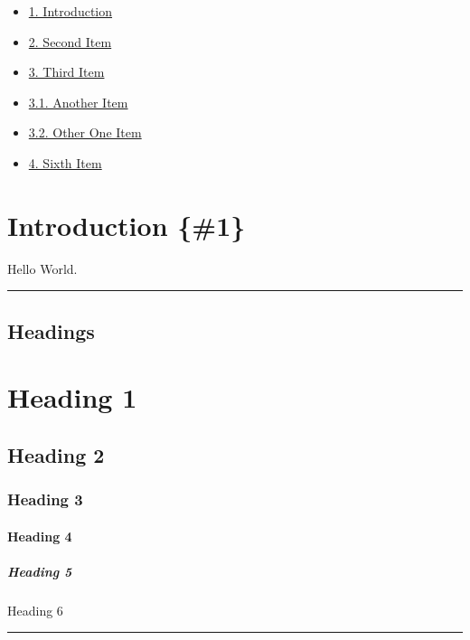 \documentclass[]{article}
\providecommand{\tightlist}{%
  \setlength{\itemsep}{0pt}\setlength{\parskip}{0pt}}
\let\oldparagraph\paragraph
\renewcommand{\paragraph}[1]{\oldparagraph{#1}\mbox{}}
\let\oldsubparagraph\subparagraph
\renewcommand{\subparagraph}[1]{\oldsubparagraph{#1}\mbox{}}
\begin{document}
\begin{itemize}
\tightlist
\item
  \protect\hyperlink{1}{1. Introduction}
\item
  \protect\hyperlink{2}{2. Second Item}
\item
  \protect\hyperlink{3}{3. Third Item}
\item
  \protect\hyperlink{4}{3.1. Another Item}
\item
  \protect\hyperlink{5}{3.2. Other One Item}
\item
  \protect\hyperlink{6}{4. Sixth Item}
\end{itemize}

\section{Introduction \{\#1\}}\label{introduction-1}

Hello World.

\begin{center}\rule{0.5\linewidth}{\linethickness}\end{center}

\subsection{Headings}\label{headings}

\section{Heading 1}\label{heading-1}

\subsection{Heading 2}\label{heading-2}

\subsubsection{Heading 3}\label{heading-3}

\paragraph{Heading 4}\label{heading-4}

\subparagraph{Heading 5}\label{heading-5}

Heading 6

\begin{center}\rule{0.5\linewidth}{\linethickness}\end{center}
\end{document}

